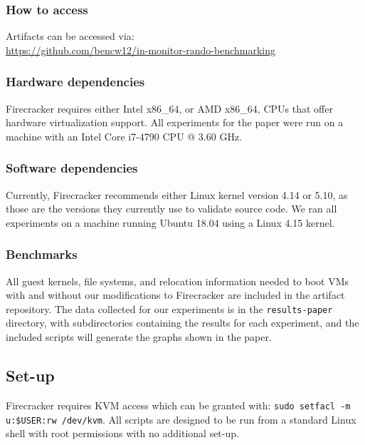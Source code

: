 \documentclass[sigplan,twocolumn]{acmart}
\begin{document}
\subsubsection{How to access}
Artifacts can be accessed via:\\
 \url{https://github.com/bencw12/in-monitor-rando-benchmarking}

\subsubsection{Hardware dependencies}
Firecracker requires either Intel x86\_64, or AMD x86\_64, CPUs
that offer hardware virtualization support. All experiments for the paper
were run on a machine with an Intel Core i7-4790 CPU @ 3.60 GHz.

\subsubsection{Software dependencies} 
Currently, Firecracker recommends either Linux kernel version 4.14 or 5.10, as those are
the versions they currently use to validate source code. We ran all experiments on a machine running
Ubuntu 18.04 using a Linux 4.15 kernel.

\subsubsection{Benchmarks} 
All guest kernels, file systems, and relocation information needed to boot VMs
with and without our modifications to Firecracker are included in the artifact repository.
The data collected for our experiments is in the \texttt{results-paper} directory, with subdirectories
containing the results for each experiment, and the included scripts will generate the graphs shown in the paper. 
\subsection{Set-up}
Firecracker requires KVM access which can be granted with: \texttt{sudo setfacl -m u:\$USER:rw /dev/kvm}.
All scripts are designed to be run from a standard Linux shell with root permissions with no additional set-up. 
\end{document}

